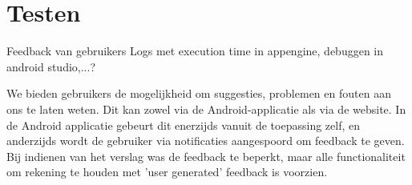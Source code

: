 \chapter{Testen}%
Feedback van gebruikers
Logs met execution time in appengine, debuggen in android studio,...?


We bieden gebruikers de mogelijkheid om suggesties, problemen en fouten aan ons te laten weten.
Dit kan zowel via de Android-applicatie als via de website. In de Android applicatie gebeurt dit enerzijds vanuit de toepassing zelf, en anderzijds wordt de gebruiker via notificaties aangespoord om feedback te geven. Bij indienen van het verslag was de feedback te beperkt, maar alle functionaliteit om rekening te houden met 'user generated' feedback is voorzien.
